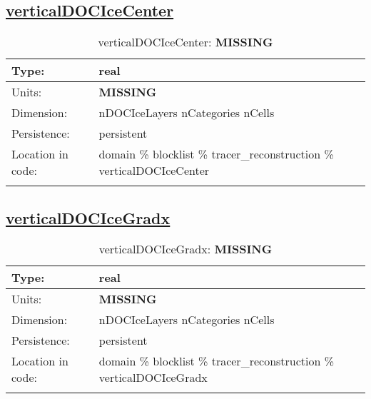 \subsection[verticalDOCIceCenter]{\hyperref[sec:var_tab_tracer_reconstruction]{verticalDOCIceCenter}}
\label{subsec:var_sec_tracer_reconstruction_verticalDOCIceCenter}
\begin{center}
\begin{longtable}{| p{2.0in} | p{4.0in} |}
        \hline 
        Type: & real \\
        \hline 
        Units: & {\bf \color{red} MISSING} \\
        \hline 
        Dimension: & nDOCIceLayers nCategories nCells \\
        \hline 
        Persistence: & persistent \\
        \hline 
         Location in code: & domain \% blocklist \% tracer\_reconstruction \% verticalDOCIceCenter \\
         \hline 
    \caption{verticalDOCIceCenter: {\bf \color{red} MISSING}}
\end{longtable}
\end{center}
\subsection[verticalDOCIceGradx]{\hyperref[sec:var_tab_tracer_reconstruction]{verticalDOCIceGradx}}
\label{subsec:var_sec_tracer_reconstruction_verticalDOCIceGradx}
\begin{center}
\begin{longtable}{| p{2.0in} | p{4.0in} |}
        \hline 
        Type: & real \\
        \hline 
        Units: & {\bf \color{red} MISSING} \\
        \hline 
        Dimension: & nDOCIceLayers nCategories nCells \\
        \hline 
        Persistence: & persistent \\
        \hline 
         Location in code: & domain \% blocklist \% tracer\_reconstruction \% verticalDOCIceGradx \\
         \hline 
    \caption{verticalDOCIceGradx: {\bf \color{red} MISSING}}
\end{longtable}
\end{center}
